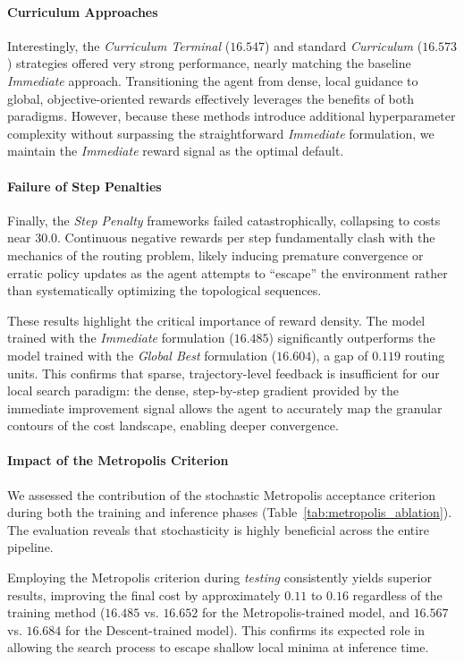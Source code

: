 \documentclass[letterpaper]{article} %
\begin{document}
\paragraph{Curriculum Approaches}
Interestingly, the \textit{Curriculum Terminal} ($16.547$) and standard \textit{Curriculum} ($16.573$) strategies offered very strong performance, nearly matching the baseline \textit{Immediate} approach. Transitioning the agent from dense, local guidance to global, objective-oriented rewards effectively leverages the benefits of both paradigms. However, because these methods introduce additional hyperparameter complexity without surpassing the straightforward \textit{Immediate} formulation, we maintain the \textit{Immediate} reward signal as the optimal default.

\paragraph{Failure of Step Penalties}
Finally, the \textit{Step Penalty} frameworks failed catastrophically, collapsing to costs near $30.0$. Continuous negative rewards per step fundamentally clash with the mechanics of the routing problem, likely inducing premature convergence or erratic policy updates as the agent attempts to ``escape'' the environment rather than systematically optimizing the topological sequences.

These results highlight the critical importance of reward density. The model trained with the \textit{Immediate} formulation ($16.485$) significantly outperforms the model trained with the \textit{Global Best} formulation ($16.604$), a gap of $0.119$ routing units. This confirms that sparse, trajectory-level feedback is insufficient for our local search paradigm: the dense, step-by-step gradient provided by the immediate improvement signal allows the agent to accurately map the granular contours of the cost landscape, enabling deeper convergence.

\paragraph{Impact of the Metropolis Criterion}
We assessed the contribution of the stochastic Metropolis acceptance criterion during both the training and inference phases (Table~\ref{tab:metropolis_ablation}). The evaluation reveals that stochasticity is highly beneficial across the entire pipeline. 

Employing the Metropolis criterion during \textit{testing} consistently yields superior results, improving the final cost by approximately $0.11$ to $0.16$ regardless of the training method ($16.485$ vs. $16.652$ for the Metropolis-trained model, and $16.567$ vs. $16.684$ for the Descent-trained model). This confirms its expected role in allowing the search process to escape shallow local minima at inference time.
\end{document}
